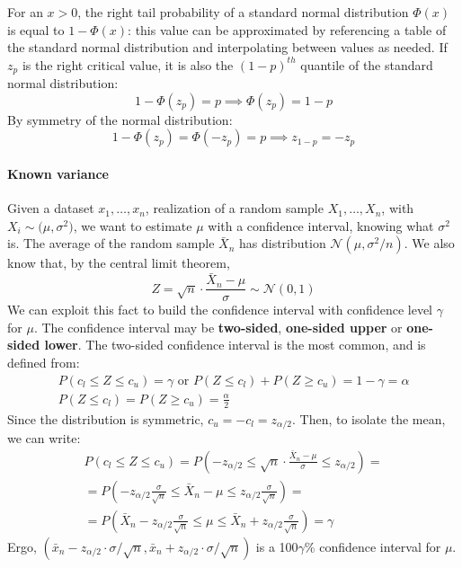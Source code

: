 For an $x >0$, the right tail probability of a standard normal distribution $\Phi(x)$ is equal to $1 - \Phi(x)$: this value can be approximated by referencing a table of the standard normal distribution and interpolating between values as needed. If $z_p$ is the right critical value, it is also the $(1-p)^{th}$ quantile of the standard normal distribution:
\begin{equation*}
    1 - \Phi(z_p) = p \implies \Phi(z_p) = 1 - p
\end{equation*}
By symmetry of the normal distribution:
\begin{equation*}
    1 - \Phi(z_p) = \Phi(-z_p) = p \implies z_{1-p} = -z_p
\end{equation*}

\paragraph{Known variance}

Given a dataset $x_1, \ldots, x_n$, realization of a random sample $X_1, \ldots, X_n$, with $X_i \sim \mathcal(\mu, \sigma^2)$, we want to estimate $\mu$ with a confidence interval, knowing what $\sigma^2$ is. The average of the random sample $\bar{X}_n$ has distribution $\mathcal{N}(\mu, \sigma^2/n)$. We also know that, by the central limit theorem,
\begin{equation*}
    Z = \sqrt{n} \cdot \frac{\bar{X}_n - \mu}{\sigma} \sim \mathcal{N}(0,1)
\end{equation*}
We can exploit this fact to build the confidence interval with confidence level $\gamma$ for $\mu$. The confidence interval may be \textbf{two-sided}, \textbf{one-sided upper} or \textbf{one-sided lower}. The two-sided confidence interval is the most common, and is defined from:
\begin{gather*}
    P(c_l \leq Z \leq c_u) = \gamma \text{ or } P(Z \leq c_l) + P(Z \geq c_u) = 1 - \gamma = \alpha \\
    P(Z \leq c_l) = P(Z \geq c_u) = \frac{\alpha}{2}
\end{gather*}
Since the distribution is symmetric, $c_u = - c_l = z_{\alpha/2}$. Then, to isolate the mean, we can write:
\begin{gather*}
    P(c_l \leq Z \leq c_u) = P(-z_{\alpha/2} \leq \sqrt{n} \cdot \frac{\bar{X}_n - \mu}{\sigma} \leq z_{\alpha/2}) =\\
    = P(-z_{\alpha/2} \frac{\sigma}{\sqrt{n}} \leq \bar{X}_n - \mu \leq z_{\alpha/2} \frac{\sigma}{\sqrt{n}}) = \\
    = P(\bar{X}_n - z_{\alpha/2} \frac{\sigma}{\sqrt{n}} \leq \mu \leq \bar{X}_n + z_{\alpha/2} \frac{\sigma}{\sqrt{n}}) = \gamma
\end{gather*}
Ergo, $(\bar{x}_n - z_{\alpha/2} \cdot \sigma / \sqrt{n}, \bar{x}_n + z_{\alpha/2} \cdot \sigma / \sqrt{n})$ is a 100$\gamma$\% confidence interval for $\mu$. 

